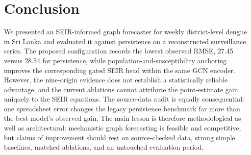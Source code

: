 \documentclass[conference]{IEEEtran}
\begin{document}
\section{Conclusion}
We presented an SEIR-informed graph forecaster for weekly district-level dengue in Sri Lanka and evaluated it against persistence on a reconstructed surveillance series.
The proposed configuration records the lowest observed RMSE, 27.45 versus 28.54 for persistence, while population-and-susceptibility anchoring improves the corresponding gated SEIR head within the same GCN encoder. %
However, the nine-origin evidence does not establish a statistically reliable advantage, and the current ablations cannot attribute the point-estimate gain uniquely to the SEIR equations. %
The source-data audit is equally consequential: one spreadsheet error changes the legacy persistence benchmark far more than the best model's observed gain. %
The main lesson is therefore methodological as well as architectural: mechanistic graph forecasting is feasible and competitive, but claims of improvement should rest on source-checked data, strong simple baselines, matched ablations, and an untouched evaluation period.



\end{document}
